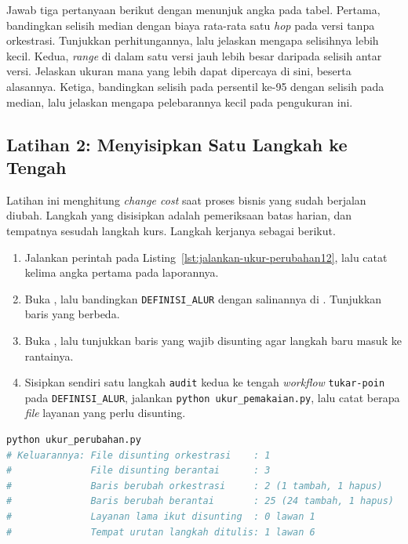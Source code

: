 Jawab tiga pertanyaan berikut dengan menunjuk angka pada tabel. Pertama,
bandingkan selisih median dengan biaya rata-rata satu \textit{hop} pada versi
tanpa orkestrasi. Tunjukkan perhitungannya, lalu jelaskan mengapa selisihnya
lebih kecil. Kedua,
\textit{range} di dalam satu versi jauh lebih besar daripada selisih antar
versi. Jelaskan ukuran mana yang lebih dapat dipercaya di sini, beserta
alasannya. Ketiga, bandingkan selisih pada persentil ke-95 dengan selisih pada
median, lalu jelaskan mengapa pelebarannya kecil pada pengukuran ini.

\subsection*{Latihan 2: Menyisipkan Satu Langkah ke Tengah}

Latihan ini menghitung \textit{change cost} saat proses bisnis yang sudah
berjalan diubah.
Langkah yang disisipkan adalah pemeriksaan batas harian, dan tempatnya sesudah
langkah kurs. Langkah kerjanya sebagai berikut.

\begin{enumerate}
  \item Jalankan perintah pada Listing~\ref{lst:jalankan-ukur-perubahan12}, lalu
    catat kelima angka pertama pada laporannya.
  \item Buka , lalu bandingkan
    \texttt{DEFINISI\_ALUR} dengan salinannya di
    . Tunjukkan baris yang
    berbeda.
  \item Buka , lalu tunjukkan baris
    yang wajib disunting agar langkah baru masuk ke rantainya.
  \item Sisipkan sendiri satu langkah \texttt{audit} kedua ke tengah \textit{workflow}
    \texttt{tukar-poin} pada \texttt{DEFINISI\_ALUR}, jalankan
    \texttt{python ukur\_pemakaian.py}, lalu catat berapa \textit{file} layanan yang
    perlu disunting.
\end{enumerate}

\begin{lstlisting}[language=bash, caption={Menghitung \textit{change cost}
  saat menyisipkan satu langkah, skrip tersedia di \berkas{sources/chapter12/ukur_perubahan.py}},
  label=lst:jalankan-ukur-perubahan12]
python ukur_perubahan.py
# Keluarannya: File disunting orkestrasi    : 1
#              File disunting berantai      : 3
#              Baris berubah orkestrasi     : 2 (1 tambah, 1 hapus)
#              Baris berubah berantai       : 25 (24 tambah, 1 hapus)
#              Layanan lama ikut disunting  : 0 lawan 1
#              Tempat urutan langkah ditulis: 1 lawan 6
\end{lstlisting}

